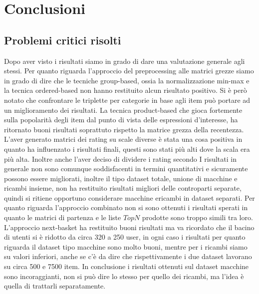 \hypertarget{(chap:conclusioni)}{}
\chapter{Conclusioni}

\section{Problemi critici risolti}
Dopo aver visto i risultati siamo in grado di dare una valutazione generale agli stessi. Per quanto riguarda l'approccio del preprocessing alle matrici grezze siamo in grado di dire che le tecniche group-based, ossia la normalizzazione min-max e la tecnica ordered-based non hanno restituito alcun risultato positivo. Si è però notato che confrontare le triplette per categorie in base agli item può portare ad un miglioramento dei risultati.
La tecnica product-based che gioca fortemente sulla popolarità degli item dal punto di vista delle espressioni d'interesse, ha ritornato buoni risultati soprattuto rispetto la matrice grezza della recentezza.\\
L'aver generato matrici dei rating su scale diverse è stata una cosa positiva in quanto ha influenzato i risultati finali, questi sono stati più alti dove la scala era più alta.
Inoltre anche l'aver deciso di dividere i rating secondo 
I risultati in generale non sono comunque soddisfacenti in termini quantitativi e sicuramente possono essere migliorati, inoltre il tipo dataset totale, unione di macchine e ricambi insieme, non ha restituito risultati migliori delle controparti separate, quindi si ritiene opportuno considerare macchine ericambi in dataset separati. 
Per quanto riguarda l'approccio combinato non si sono ottenuti i risultati sperati in quanto le matrici di partenza e le liste $TopN$ prodotte sono troppo simili tra loro.
L'approccio next-basket ha restituito buoni risultati ma va ricordato che il bacino di utenti si è ridotto da circa 320 a 250 user, in ogni caso i risultati per quanto riguarda il dataset tipo macchine sono molto buoni, mentre per i ricambi siamo su valori inferiori, anche se c'è da dire che rispettivamente i due dataset lavorano su circa 500 e 7500 item.
In conclusione i risultati ottenuti sul dataset macchine sono incoraggianti, non si può dire lo stesso per quello dei ricambi, ma l'idea è quella di trattarli separatamente.

